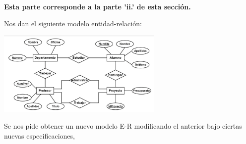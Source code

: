 \begin{center}
    \textbf{Esta parte corresponde a la parte 'ii.' de esta sección.}
\end{center}

\vspace{.3cm}

Nos dan el siguiente modelo entidad-relación:\\

\begin{center}
    \includegraphics[width=8cm]{resources/ER_2.2.5.png}
\end{center}

Se nos pide obtener un nuevo modelo E-R modificando el anterior bajo ciertas nuevas
especificaciones, 